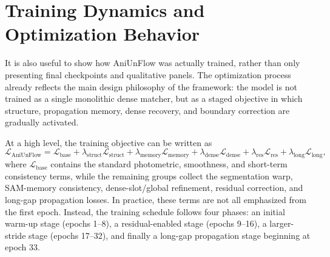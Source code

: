 \begin{table}[t]
\centering
\caption{\textbf{Curriculum used for the main AniUnFlow training recipe.} Epoch ranges follow the conservative staged schedule used by the framework and are included here because the training schedule is part of the architecture story.}
\label{tab:training_curriculum}
\end{table}

\section{Training Dynamics and Optimization Behavior}

It is also useful to show how AniUnFlow was actually trained, rather than only presenting final checkpoints and qualitative panels. The optimization process already reflects the main design philosophy of the framework: the model is not trained as a single monolithic dense matcher, but as a staged objective in which structure, propagation memory, dense recovery, and boundary correction are gradually activated.

At a high level, the training objective can be written as
\begin{equation}
\mathcal{L}_{\text{AniUnFlow}} =
\mathcal{L}_{\text{base}}
 + \lambda_{\text{struct}} \mathcal{L}_{\text{struct}}
 + \lambda_{\text{memory}} \mathcal{L}_{\text{memory}}
 + \lambda_{\text{dense}} \mathcal{L}_{\text{dense}}
 + \lambda_{\text{res}} \mathcal{L}_{\text{res}}
 + \lambda_{\text{long}} \mathcal{L}_{\text{long}},
\label{eq:training_objective_grouped}
\end{equation}
where $\mathcal{L}_{\text{base}}$ contains the standard photometric, smoothness, and short-term consistency terms, while the remaining groups collect the segmentation warp, SAM-memory consistency, dense-slot/global refinement, residual correction, and long-gap propagation losses. In practice, these terms are not all emphasized from the first epoch. Instead, the training schedule follows four phases: an initial warm-up stage (epochs 1--8), a residual-enabled stage (epochs 9--16), a larger-stride stage (epochs 17--32), and finally a long-gap propagation stage beginning at epoch 33.

